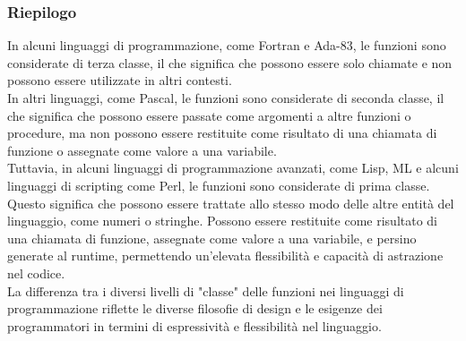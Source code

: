 \documentclass{article}
\begin{document}
	\subsubsection{Riepilogo}
	In alcuni linguaggi di programmazione, come Fortran e Ada-83, le funzioni sono considerate di terza classe, il che significa che possono essere solo chiamate e non possono essere utilizzate in altri contesti.
	\vspace{\baselineskip} \\
	In altri linguaggi, come Pascal, le funzioni sono considerate di seconda classe, il che significa che possono essere passate come argomenti a altre funzioni o procedure, ma non possono essere restituite come risultato di una chiamata di funzione o assegnate come valore a una variabile.
	\vspace{\baselineskip} \\
	Tuttavia, in alcuni linguaggi di programmazione avanzati, come Lisp, ML e alcuni linguaggi di scripting come Perl, le funzioni sono considerate di prima classe. Questo significa che possono essere trattate allo stesso modo delle altre entità del linguaggio, come numeri o stringhe. Possono essere restituite come risultato di una chiamata di funzione, assegnate come valore a una variabile, e persino generate al runtime, permettendo un'elevata flessibilità e capacità di astrazione nel codice.
	\vspace{\baselineskip} \\
	La differenza tra i diversi livelli di "classe" delle funzioni nei linguaggi di programmazione riflette le diverse filosofie di design e le esigenze dei programmatori in termini di espressività e flessibilità nel linguaggio.
\end{document}
